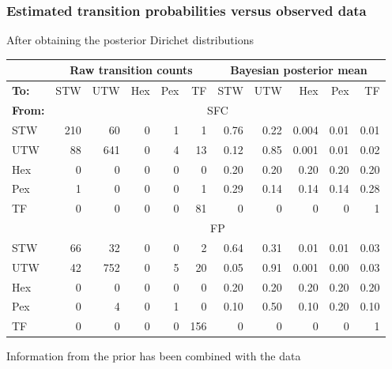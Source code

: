 \begin{frame}

\frametitle{Estimated transition probabilities versus observed data}

After obtaining the posterior Dirichet distributions
{\footnotesize

\begin{tabular}{l|rrrrr||rrrrr} \\ \hline
&\multicolumn{5}{c||}{\alert{Raw transition counts}} & \multicolumn{5}{c}{\alert{Bayesian posterior mean}} \\ \hline
    \textbf{To:}&STW&UTW&Hex&Pex&TF  &STW&UTW&Hex&Pex&TF\\ \hline
\textbf{From:}&\multicolumn{10}{c}{SFC} \\ \hline
 STW & 210 &  60 & 0 & 1 &  1 & 0.76 & 0.22 & 0.004 & 0.01 & 0.01  \\  
 UTW &  88 & 641 & 0 & 4 & 13 & 0.12 & 0.85 & 0.001 & 0.01 & 0.02  \\  
 Hex &   0 &   0 & 0 & 0 &  0 & 0.20 & 0.20 & 0.20 & 0.20 & 0.20   \\  
 Pex &   1 &   0 & 0 & 0 &  1 & 0.29 & 0.14 & 0.14 & 0.14 & 0.28   \\  
 TF  &   0 &   0 & 0 & 0 & 81 &   0 &   0 & 0 & 0 & 1              \\ 
 \hline
 &\multicolumn{10}{c}{FP} \\ \hline
 STW &  66 &  32 & 0 & 0 &  2 & 0.64 & 0.31 & 0.01 & 0.01 & 0.03   \\  
 UTW &  42 & 752 & 0 & 5 & 20 & 0.05 & 0.91 & 0.001 & 0.00 & 0.03  \\  
 Hex &   0 &   0 & 0 & 0 &  0 & 0.20 & 0.20 & 0.20 & 0.20 & 0.20   \\  
 Pex &   0 &   4 & 0 & 1 &  0 & 0.10 & 0.50 & 0.10 & 0.20 & 0.10   \\  
 TF  &   0 &   0 & 0 & 0 &156 &  0 &   0 & 0 & 0 & 1               \\ 
 \hline 
\end{tabular}
}

\vfill \small
Information from the prior has been combined with the data

\end{frame}




